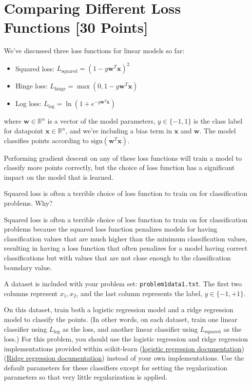 
\newpage
\section{Comparing Different Loss Functions [30 Points]}

We've discussed three loss functions for linear models so far:
\begin{itemize}
\item Squared loss: $L_\text{squared} = (1 - y\mathbf{w}^T\mathbf{x})^2$
\item Hinge loss: $L_\text{hinge} = \max(0, 1 - y\mathbf{w}^T\mathbf{x})$
\item Log loss: $L_\text{log} = \ln(1 + e^{-y\mathbf{w}^T\mathbf{x}})$
\end{itemize}
where $\mathbf{w} \in \mathbb{R}^n$ is a vector of the model parameters, $y \in \{-1,1\}$ is the class label for datapoint $\mathbf{x} \in \mathbb{R}^n$, and we're including a bias term in $\mathbf{x}$ and $\mathbf{w}$.  The model classifies points according to $\text{sign}(\mathbf{w}^T\mathbf{x})$.

Performing gradient descent on any of these loss functions will train a model to classify more points correctly, but the choice of loss function has a significant impact on the model that is learned.

\problem[3]
Squared loss is often a terrible choice of loss function to train on for classification problems.  Why?

Squared loss is often a terrible choice of loss function to train on for classification problems because the squared loss function penalizes models for having classification values that are much higher than the minimum classification values, resulting in having a loss function that often penalizes for a model having correct classifications but with values that are not close enough to the classification boundary value.

\problem[9]
A dataset is included with your problem set: \texttt{problem1data1.txt}. The first two columns represent $x_1, x_2$, and the last column represents the label, $y \in \{-1,+1\}$.

On this dataset, train both a logistic regression model and a ridge regression model to classify the points.  (In other words, on each dataset, train one linear classifier using $L_\text{log}$ as the loss, and another linear classifier using $L_\text{squared}$ as the loss.) For this problem, you should use the logistic regression and ridge regression implementations provided within scikit-learn
(\href{http://scikit-learn.org/stable/modules/generated/sklearn.linear_model.LogisticRegression.html}{logistic regression documentation})
(\href{http://scikit-learn.org/stable/modules/generated/sklearn.linear_model.Ridge.html}{Ridge regression documentation})
instead of your own implementations. Use the default parameters for these classifiers except for setting the regularization parameters so that very little regularization is applied.

